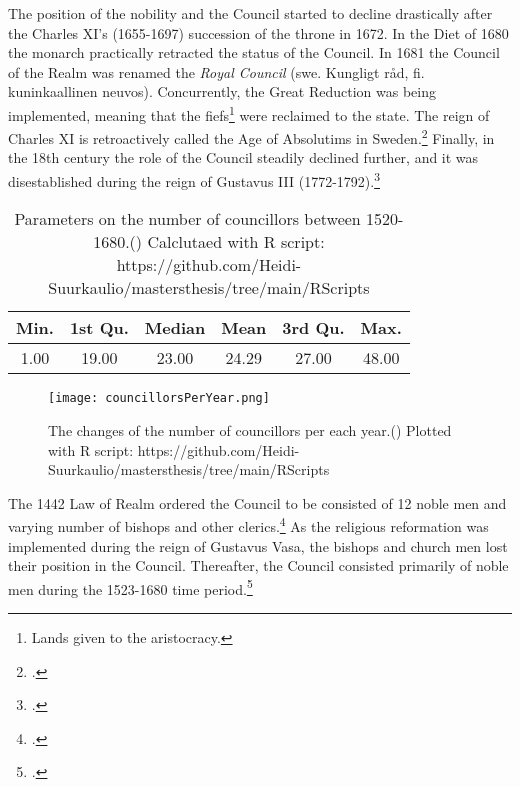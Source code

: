 The position of the nobility and the Council started to decline drastically after the Charles XI's (1655-1697) succession of the throne in 1672. In the Diet of 1680 the monarch practically retracted the status of the Council. In 1681 the Council of the Realm was renamed the \textit{Royal Council} (swe. Kungligt råd, fi. kuninkaallinen neuvos). Concurrently, the Great Reduction was being implemented, meaning that the fiefs\footnote{Lands given to the aristocracy.} were reclaimed to the state. The reign of Charles XI is retroactively called the Age of Absolutims in Sweden.\footcites[p. 289-295,]{pSuurvalta}[p. 8-9.]{personalAgency} Finally, in the 18th century the role of the Council steadily declined further, and it was disestablished during the reign of Gustavus III (1772-1792).\footcite[p. 14.]{hopesAndFearsIntro}

\begin{table}
	\caption[Parameters on the number of councillors between 1520-1680]{Parameters on the number of councillors between 1520-1680.(\cite{councillorsDS}) Calclutaed with R script: https://github.com/Heidi-Suurkaulio/mastersthesis/tree/main/RScripts}
	\label{tab:councillors}
	\centering
\begin{tabular}{c c c c c c}
	\hline
	Min. & 1st Qu. & Median & Mean & 3rd Qu. & Max.\\
	\hline
	1.00 & 19.00 & 23.00 & 24.29 & 27.00 & 48.00\\
	\hline
\end{tabular}
\end{table}

\begin{figure}[h]
	\texttt{[image: councillorsPerYear.png]}
	\centering
	\caption[The changes of the number of councillors per each year 1520-1680]{The changes of the number of councillors per each year.(\cite{councillorsDS}) Plotted with R script: https://github.com/Heidi-Suurkaulio/mastersthesis/tree/main/RScripts} 
	\centering
	\label{fig:peryear}
\end{figure}

The 1442 Law of Realm ordered the Council to be consisted of 12 noble men and varying number of bishops and other clerics.\footcite[p. 49.]{HakanenAKoskinen2017} As the religious reformation was implemented during the reign of Gustavus Vasa, the bishops and church men lost their position in the Council. Thereafter, the Council consisted primarily of noble men during the 1523-1680 time period.\footcites[p. 72-75,]{pSuurvalta}[p. 15]{agencyAndStateBuilding} 

